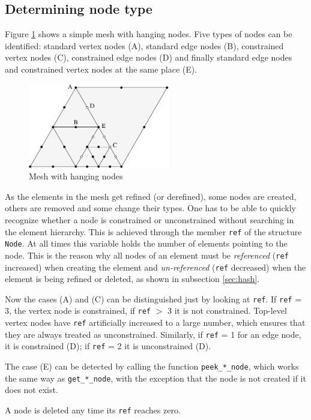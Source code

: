 \subsection{Determining node type}

Figure \ref{fig_nodes} shows a simple mesh with hanging nodes. 
Five types of nodes can be identified: standard vertex nodes (A), 
standard edge nodes (B), constrained vertex nodes (C), constrained
edge nodes (D) and finally standard edge nodes and constrained
vertex nodes at the same place (E).

\begin{figure}[H]
  \centering
  \includegraphics[width=0.55\textwidth]{img/nodes.pdf}
  \caption{Mesh with hanging nodes}
  \label{fig_nodes}
\end{figure}

As the elements in the mesh get refined (or derefined), some
nodes are created, others are removed and some change their types.
One has to be able to quickly recognize whether a node is constrained
or unconstrained without searching in the element hierarchy.
This is achieved through the member {\tt ref} of the structure {\tt Node}.
At all times this variable holds the number of elements pointing
to the node. This is the reason why all nodes of an element must be 
\emph{referenced} ({\tt ref} increased) when creating the element and
\emph{un-referenced} ({\tt ref} decreased) when the element is being
refined or deleted, as shown in subsection \ref{sec:hash}.

Now the cases (A) and (C) can be distinguished just by looking at {\tt ref}.
If {\tt ref} = 3, the vertex node is constrained, if {\tt ref} $>$ 3 it
is not constrained. Top-level vertex nodes have {\tt ref} artificially
increased to a large number, which ensures that they are always treated as
unconstrained. Similarly, if {\tt ref} = 1 for an edge node, it is
constrained (D); if {\tt ref} = 2 it is unconstrained (D).

The case (E) can be detected by calling the function
{\tt peek\_*\_node}, which works the same way as
{\tt get\_*\_node}, with the exception that the node is not 
created if it does not exist. 

A node is deleted any time its {\tt ref} reaches zero.
